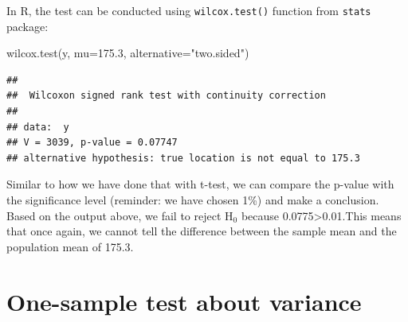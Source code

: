 \documentclass[
]{book}
\newenvironment{Shaded}{\begin{snugshade}}{\end{snugshade}}
\newcommand{\AttributeTok}[1]{\textcolor[rgb]{0.77,0.63,0.00}{#1}}
\newcommand{\FloatTok}[1]{\textcolor[rgb]{0.00,0.00,0.81}{#1}}
\newcommand{\FunctionTok}[1]{\textcolor[rgb]{0.00,0.00,0.00}{#1}}
\newcommand{\NormalTok}[1]{#1}
\newcommand{\StringTok}[1]{\textcolor[rgb]{0.31,0.60,0.02}{#1}}
\theoremstyle{definition}
\theoremstyle{definition}
\theoremstyle{definition}
\theoremstyle{definition}
\theoremstyle{remark}
\begin{document}
In R, the test can be conducted using \texttt{wilcox.test()} function from \texttt{stats} package:

\begin{Shaded}
\begin{Highlighting}[]
\FunctionTok{wilcox.test}\NormalTok{(y, }\AttributeTok{mu=}\FloatTok{175.3}\NormalTok{, }\AttributeTok{alternative=}\StringTok{"two.sided"}\NormalTok{)}
\end{Highlighting}
\end{Shaded}

\begin{verbatim}
## 
##  Wilcoxon signed rank test with continuity correction
## 
## data:  y
## V = 3039, p-value = 0.07747
## alternative hypothesis: true location is not equal to 175.3
\end{verbatim}

Similar to how we have done that with t-test, we can compare the p-value with the significance level (reminder: we have chosen 1\%) and make a conclusion. Based on the output above, we fail to reject H\(_0\) because 0.0775\textgreater0.01.This means that once again, we cannot tell the difference between the sample mean and the population mean of 175.3.

\hypertarget{statisticalTestsOneSampleVariance}{%
\section{One-sample test about variance}\label{statisticalTestsOneSampleVariance}}
\end{document}

